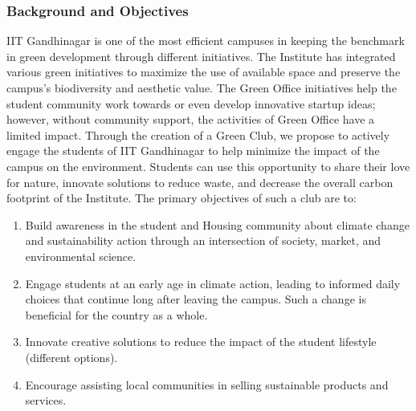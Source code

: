 \documentclass[12pt]{article}
\begin{document}
\subsubsection{Background and Objectives}
IIT Gandhinagar is one of the most efficient campuses in keeping the benchmark in green
development through different initiatives. The Institute has integrated various green initiatives
to maximize the use of available space and preserve the campus's biodiversity and aesthetic
value. The Green Office initiatives help the student community work towards or even develop
innovative startup ideas; however, without community support, the activities of Green Office
have a limited impact. Through the creation of a Green Club, we propose to actively engage the
students of IIT Gandhinagar to help minimize the impact of the campus on the environment.
Students can use this opportunity to share their love for nature, innovate solutions to reduce
waste, and decrease the overall carbon footprint of the Institute. The primary objectives of such
a club are to:
\begin{enumerate}
    \item Build awareness in the student and Housing community about climate change and
    sustainability action through an intersection of society, market, and environmental
    science.
    \item Engage students at an early age in climate action, leading to informed daily choices that
    continue long after leaving the campus. Such a change is beneficial for the country as a
    whole.
    \item Innovate creative solutions to reduce the impact of the student lifestyle (different
    options).
    \item Encourage assisting local communities in selling sustainable products and services.
\end{enumerate}
\end{document}
